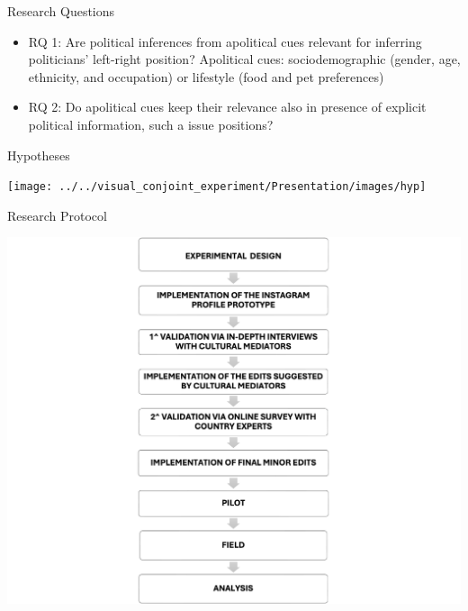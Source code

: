 \documentclass[
  ignorenonframetext,
]{beamer}
\begin{document}
\begin{frame}{Research Questions}
\label{research-questions}
\begin{itemize}
\item
  RQ 1: Are political inferences from apolitical cues relevant for
  inferring politicians' left-right position? Apolitical cues:
  sociodemographic (gender, age, ethnicity, and occupation) or lifestyle
  (food and pet preferences)
\item
  RQ 2: Do apolitical cues keep their relevance also in presence of
  explicit political information, such a issue positions?
\end{itemize}
\end{frame}

\begin{frame}{Hypotheses}
\label{hypotheses}
\begin{center}\texttt{[image: ../../visual\_conjoint\_experiment/Presentation/images/hyp]} \end{center}
\end{frame}

\begin{frame}{Research Protocol}
\label{research-protocol}
\begin{center}\includegraphics[width=0.9\linewidth]{Presentation/images/diagramma} \end{center}
\end{frame}
\end{document}
